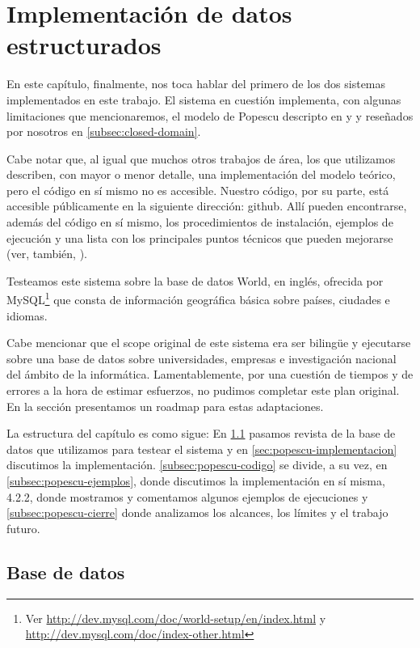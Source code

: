 \chapter{Implementación de datos estructurados}
\label{chap:4}
En este capítulo, finalmente, nos toca hablar del primero de los dos sistemas implementados en este trabajo.
El sistema en cuestión implementa, con algunas limitaciones que mencionaremos, el modelo de Popescu descripto en \cite{QADB1} y \cite{QADB2} y reseñados por nosotros en \ref{subsec:closed-domain}.


Cabe notar que, al igual que muchos otros trabajos de área, los que utilizamos describen, con mayor o menor detalle, una implementación del modelo teórico, pero el código en sí mismo no es accesible. Nuestro código, por su parte, está accesible públicamente en la siguiente dirección: github. Allí pueden encontrarse, además del código en sí mismo, los procedimientos de instalación, ejemplos de ejecución y una lista con los principales puntos técnicos que pueden mejorarse (ver, también, ).


Testeamos este sistema sobre la base de datos World, en inglés, ofrecida por MySQL\footnote{Ver \url{http://dev.mysql.com/doc/world-setup/en/index.html} y \url{http://dev.mysql.com/doc/index-other.html}} que consta de información geográfica básica sobre países, ciudades e idiomas.

Cabe mencionar que el scope original de este sistema era ser bilingüe y ejecutarse sobre una base de datos sobre universidades, empresas e investigación nacional del ámbito de la informática. Lamentablemente, por una cuestión de tiempos y de errores a la hora de estimar esfuerzos, no pudimos completar este plan original. En la sección  presentamos un roadmap para estas adaptaciones.

La estructura del capítulo es como sigue: En \ref{sec:popescu-db} pasamos revista de la base de datos que utilizamos para testear el sistema y en \ref{sec:popescu-implementacion} discutimos la implementación. \ref{subsec:popescu-codigo} se divide, a su vez, en \ref{subsec:popescu-ejemplos}, donde discutimos la implementación en sí misma, 4.2.2, donde mostramos y comentamos algunos ejemplos de ejecuciones y \ref{subsec:popescu-cierre} donde analizamos los alcances, los límites y el trabajo futuro.


\section{Base de datos}
\label{sec:popescu-db}

